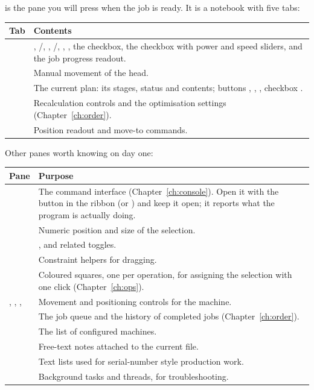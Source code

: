  is the pane you will press when the job is ready. It is a
notebook with five tabs:

\begin{center}\small
\begin{tabular}{@{}L{2.0cm}L{12.3cm}@{}}
\toprule
\textbf{Tab} & \textbf{Contents} \\
\midrule
{} & , /, ,
/, , , the 
checkbox, the  checkbox with power and speed sliders, and the job
progress readout. \\
 & Manual movement of the head. \\
 & The current plan: its stages, status and contents; buttons
, , , checkbox . \\
 & Recalculation controls and the optimisation settings
(Chapter~\ref{ch:order}). \\
 & Position readout and move-to commands. \\
\bottomrule
\end{tabular}
\end{center}

\noindent Other panes worth knowing on day one:

\begin{center}\small
\begin{tabular}{@{}L{3.2cm}L{11.1cm}@{}}
\toprule
\textbf{Pane} & \textbf{Purpose} \\
\midrule
{} & The command interface (Chapter~\ref{ch:console}). Open it with
the  button in the ribbon (or ) and keep it
open; it reports what the program is actually doing. \\
 & Numeric position and size of the selection. \\
 & ,  and related
toggles. \\
 & Constraint helpers for dragging. \\
 & Coloured squares, one per operation, for assigning the
selection with one click (Chapter~\ref{ch:ops}). \\
, , ,  & Movement and
positioning controls for the machine. \\
 & The job queue and the history of completed jobs
(Chapter~\ref{ch:order}). \\
 & The list of configured machines. \\
 & Free-text notes attached to the current file. \\
 & Text lists used for serial-number style production work. \\
 & Background tasks and threads, for troubleshooting. \\
\bottomrule
\end{tabular}
\end{center}

